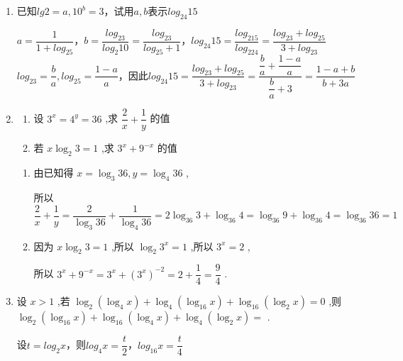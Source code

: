 \begin{enumerate}
\begin{jieda}
\begin{enumerate}
            \item $\dfrac{1}{log_2{3}} + \dfrac{lg13.5}{lg3} = \dfrac{log_3{2}}{log_3{3}} + log_3{13.5} = log_3{27} = 3$
        \end{enumerate}
    \end{jieda}
    \item 已知$lg2 = a, 10^b = 3$，试用$a, b$表示$log_{24}15$
    \begin{jieda}
        $a = \dfrac{1}{1+log_25}$，$b = \dfrac{log_23}{log_2{10}} = \dfrac{log_23}{log_25+1}$，$log_{24}15 = \dfrac{log_215}{log_224} = \dfrac{log_23 + log_25}{3+log_23}$ \\
        $log_23 = \dfrac{b}{a}, log_25 = \dfrac{1-a}{a}$，因此$log_{24}15 = \dfrac{log_23 + log_25}{3+log_23} = \dfrac{\dfrac{b}{a} + \dfrac{1-a}{a}}{\dfrac{b}{a}+3} = \dfrac{1-a+b}{b+3a}$
    \end{jieda}
    \item \begin{enumerate}
        \item 设 ${3}^{x} = {4}^{y} = {36}$ ,求 $\dfrac{2}{x} + \dfrac{1}{y}$ 的值
        \item 若 $x{\log }_{2}3 = 1$ ,求 ${3}^{x} + {9}^{-x}$ 的值
    \end{enumerate}
    \begin{jieda}
        \begin{enumerate}
            \item 由已知得 $x = {\log }_{3}{36},y = {\log }_{4}{36}$ ,

            所以 $\dfrac{2}{x} + \dfrac{1}{y} = \dfrac{2}{{\log }_{3}{36}} + \dfrac{1}{{\log }_{4}{36}} = 2{\log }_{36}3 + {\log }_{36}4 = {\log }_{36}9 + {\log }_{36}4 = {\log }_{36}{36} = 1$
            \item 因为 $x{\log }_{2}3 = 1$ ,所以 ${\log }_{2}{3}^{x} = 1$ ,所以 ${3}^{x} = 2$ ,

            所以 ${3}^{x} + {9}^{-x} = {3}^{x} + {\left( {3}^{x}\right) }^{-2} = 2 + \dfrac{1}{4} = \dfrac{9}{4}$ .
        \end{enumerate}
    \end{jieda} 
    \item 设 $x > 1$ ,若 ${\log }_{2}\left( {{\log }_{4}x}\right)  + {\log }_{4}\left( {{\log }_{16}x}\right)  + {\log }_{16}\left( {{\log }_{2}x}\right)  = 0$ ,则 ${\log }_{2}\left( {{\log }_{16}x}\right)  + {\log }_{16}\left( {{\log }_{4}x}\right)  + {\log }_{4}\left( {{\log }_{2}x}\right)  =$ .
    \begin{jieda}
        设$t = log_2x$，则$log_4x = \dfrac{t}{2}$，$log_{16}x = \dfrac{t}{4}$


\end{jieda}
\end{enumerate}
